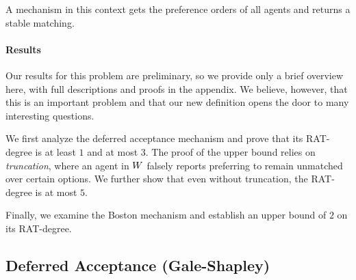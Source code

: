 A mechanism in this context gets the preference orders of all agents and returns a stable matching.


\paragraph{Results} Our results for this problem are preliminary, so we provide only a brief overview here, with full descriptions and proofs in the appendix. We believe, however, that this is an important problem and that our new definition opens the door to many interesting questions.

We first analyze the deferred acceptance mechanism and prove that its RAT-degree is at least $1$ and at most $3$. The proof of the upper bound relies on \emph{truncation}, where an agent in $W$ falsely reports preferring to remain unmatched over certain options. We further show that even without truncation, the RAT-degree is at most $5$.

Finally, we examine the Boston mechanism and establish an upper bound of $2$ on its RAT-degree.

\subsection{Deferred Acceptance (Gale-Shapley)}\label{sec:deferred-acceptance}


